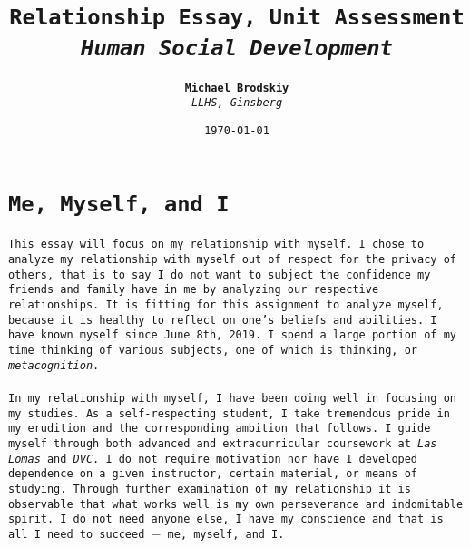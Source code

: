 \documentclass[11pt]{Essay} %
\title{\textbf{\texttt{Relationship Essay, Unit Assessment}} \\ {\Large\itshape \texttt{Human Social Development}}} %
\author{\textbf{\texttt{Michael Brodskiy}} \\ \textit{\texttt{LLHS, Ginsberg}}} %
\date{\texttt{\today}} %
\begin{document}
\maketitle %






\vspace{24pt} %


\section*{\texttt{Me, Myself, and I}}

\doublespacing

\paragraph{} \texttt{This essay will focus on my relationship with myself. I chose to analyze my relationship with myself out of respect for the privacy of others, that is to say I do not want to subject the confidence my friends and family have in me by analyzing our respective relationships. It is fitting for this assignment to analyze myself, because it is healthy to reflect on one's beliefs and abilities. I have known myself since June 8th, 2019. I spend a large portion of my time thinking of various subjects, one of which is thinking, or \textit{metacognition}.}




\paragraph{} \texttt{In my relationship with myself, I have been doing well in focusing on my studies. As a self-respecting student, I take tremendous pride in my erudition and the corresponding ambition that follows. I guide myself through both advanced and extracurricular coursework at \textit{Las Lomas} and \textit{DVC}. I do not require motivation nor have I developed dependence on a given instructor, certain material, or means of studying. Through further examination of my relationship it is observable that what works well is my own perseverance and indomitable spirit. I do not need anyone else, I have my conscience and that is all I need to succeed $-$ me, myself, and I.}
\end{document}
